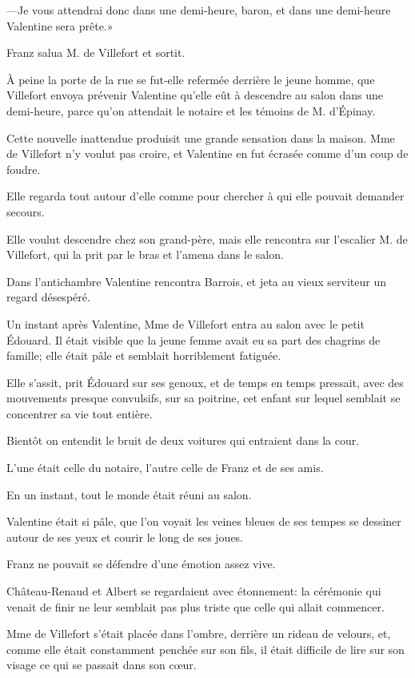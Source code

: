 —Je vous attendrai donc dans une demi-heure, baron, et dans une demi-heure Valentine sera prête.» 

Franz salua M. de Villefort et sortit. 

À peine la porte de la rue se fut-elle refermée derrière le jeune homme, que Villefort envoya prévenir Valentine qu'elle eût à descendre au salon dans une demi-heure, parce qu'on attendait le notaire et les témoins de M. d'Épinay. 

Cette nouvelle inattendue produisit une grande sensation dans la maison. Mme de Villefort n'y voulut pas croire, et Valentine en fut écrasée comme d'un coup de foudre. 

Elle regarda tout autour d'elle comme pour chercher à qui elle pouvait demander secours. 

Elle voulut descendre chez son grand-père, mais elle rencontra sur l'escalier M. de Villefort, qui la prit par le bras et l'amena dans le salon.  

Dans l'antichambre Valentine rencontra Barrois, et jeta au vieux serviteur un regard désespéré. 

Un instant après Valentine, Mme de Villefort entra au salon avec le petit Édouard. Il était visible que la jeune femme avait eu sa part des chagrins de famille; elle était pâle et semblait horriblement fatiguée. 

Elle s'assit, prit Édouard sur ses genoux, et de temps en temps pressait, avec des mouvements presque convulsifs, sur sa poitrine, cet enfant sur lequel semblait se concentrer sa vie tout entière. 

Bientôt on entendit le bruit de deux voitures qui entraient dans la cour. 

L'une était celle du notaire, l'autre celle de Franz et de ses amis. 

En un instant, tout le monde était réuni au salon. 

Valentine était si pâle, que l'on voyait les veines bleues de ses tempes se dessiner autour de ses yeux et courir le long de ses joues. 

Franz ne pouvait se défendre d'une émotion assez vive. 

Château-Renaud et Albert se regardaient avec étonnement: la cérémonie qui venait de finir ne leur semblait pas plus triste que celle qui allait commencer. 

Mme de Villefort s'était placée dans l'ombre, derrière un rideau de velours, et, comme elle était constamment penchée sur son fils, il était difficile de lire sur son visage ce qui se passait dans son cœur. 

